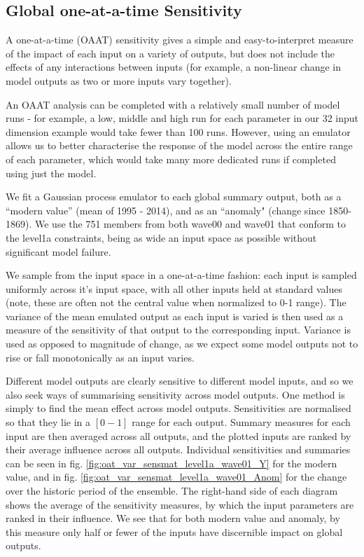 \documentclass[gmd, manuscript]{copernicus}
\begin{document}
\subsection{Global one-at-a-time Sensitivity}\label{ssec:sa_oaat}

A one-at-a-time (OAAT) sensitivity gives a simple and easy-to-interpret measure of the impact of each input on a variety of outputs, but does not include the effects of any interactions between inputs (for example, a non-linear change in model outputs as two or more inputs vary together).  

An OAAT analysis can be completed with a relatively small number of model runs - for example, a low, middle and high run for each parameter in our 32 input dimension example would take fewer than 100 runs. However, using an emulator allows us to better characterise the response of the model across the entire range of each parameter, which would take many more dedicated runs if completed using just the model.

We fit a Gaussian process emulator to each global summary output, both as a ``modern value'' (mean of 1995 - 2014), and as an ``anomaly" (change since 1850-1869). We use the 751 members from both wave00 and wave01 that conform to the level1a constraints, being as wide an input space as possible without significant model failure.

We sample from the input space in a one-at-a-time fashion: each input is sampled uniformly across it's input space, with all other inputs held at standard values (note, these are often not the central value when normalized to 0-1 range). The variance of the mean emulated output as each input is varied is then used as a measure of the sensitivity of that output to the corresponding input. Variance is used as opposed to magnitude of change, as we expect some model outputs not to rise or fall monotonically as an input varies.

Different model outputs are clearly sensitive to different model inputs, and so we also seek ways of summarising sensitivity across model outputs. One method is simply to find the mean effect across model outputs. Sensitivities are normalised so that they lie in a $[0 -1]$ range for each output. Summary measures for each input are then averaged across all outputs, and the plotted inputs are ranked by their average influence across all outputs. Individual sensitivities and summaries can be seen in fig. \ref{fig:oat_var_sensmat_level1a_wave01_Y} for the modern value, and in fig. \ref{fig:oat_var_sensmat_level1a_wave01_Anom} for the change over the historic period of the ensemble. The right-hand side of each diagram shows the average of the sensitivity measures, by which the input parameters are ranked in their influence. We see that for both modern value and anomaly, by this measure only half or fewer of the inputs have discernible impact on global outputs.
\end{document}
